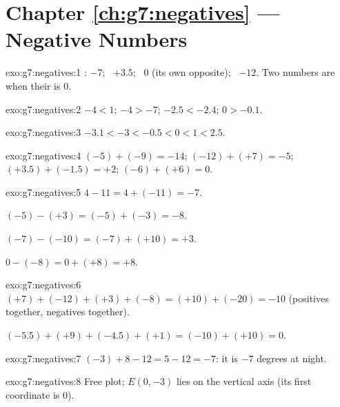 \section*{Chapter \ref{ch:g7:negatives} --- Negative Numbers}

\begin{solution}{exo:g7:negatives:1}
: $-7$; \ $+3.5$; \ $0$ (its own opposite); \ $-12$. Two
numbers are  when their  is $0$.
\end{solution}

\begin{solution}{exo:g7:negatives:2}
$-4 < 1$; \quad $-4 > -7$; \quad $-2.5 < -2.4$; \quad $0 > -0.1$.
\end{solution}

\begin{solution}{exo:g7:negatives:3}
$-3.1 < -3 < -0.5 < 0 < 1 < 2.5$.
\end{solution}

\begin{solution}{exo:g7:negatives:4}
$(-5) + (-9) = -14$; \quad
$(-12) + (+7) = -5$; \quad
$(+3.5) + (-1.5) = +2$; \quad
$(-6) + (+6) = 0$.
\end{solution}

\begin{solution}{exo:g7:negatives:5}
$4 - 11 = 4 + (-11) = -7$.

$(-5) - (+3) = (-5) + (-3) = -8$.

$(-7) - (-10) = (-7) + (+10) = +3$.

$0 - (-8) = 0 + (+8) = +8$.
\end{solution}

\begin{solution}{exo:g7:negatives:6}
$(+7) + (-12) + (+3) + (-8) = (+10) + (-20) = -10$ (positives
together, negatives together).

$(-5.5) + (+9) + (-4.5) + (+1) = (-10) + (+10) = 0$.
\end{solution}

\begin{solution}{exo:g7:negatives:7}
$(-3) + 8 - 12 = 5 - 12 = -7$: it is $-7$ degrees at night.
\end{solution}

\begin{solution}{exo:g7:negatives:8}
Free plot; $E(0, -3)$ lies on the vertical axis (its first coordinate
is $0$).
\end{solution}

